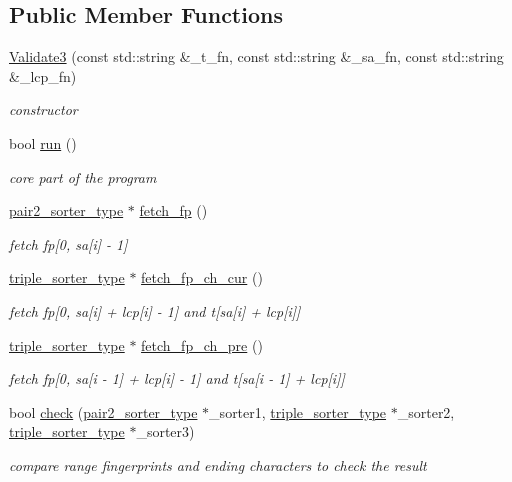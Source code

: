 \subsection*{Public Member Functions}
\begin{DoxyCompactItemize}
\item 
\hyperlink{class_validate3_ab0a59632c6e2b3bfdd0bf89483448d46}{Validate3} (const std\+::string \&\+\_\+t\+\_\+fn, const std\+::string \&\+\_\+sa\+\_\+fn, const std\+::string \&\+\_\+lcp\+\_\+fn)
\begin{DoxyCompactList}\small\item\em constructor \end{DoxyCompactList}\item 
bool \hyperlink{class_validate3_aaa21653a363d5adcc65b93ac34d22253}{run} ()
\begin{DoxyCompactList}\small\item\em core part of the program \end{DoxyCompactList}\item 
\hyperlink{class_validate3_a3a7778ec3337ed3baf9a7515cf0a94ad}{pair2\+\_\+sorter\+\_\+type} $\ast$ \hyperlink{class_validate3_ad41c23715467e5201ef2705d38d8f81d}{fetch\+\_\+fp} ()
\begin{DoxyCompactList}\small\item\em fetch fp\mbox{[}0, sa\mbox{[}i\mbox{]} -\/ 1\mbox{]} \end{DoxyCompactList}\item 
\hyperlink{class_validate3_ab3d4fd99ae8b2967f0b64b71a28efc66}{triple\+\_\+sorter\+\_\+type} $\ast$ \hyperlink{class_validate3_aeace570606a0320e2ad458145b7e16e3}{fetch\+\_\+fp\+\_\+ch\+\_\+cur} ()
\begin{DoxyCompactList}\small\item\em fetch fp\mbox{[}0, sa\mbox{[}i\mbox{]} + lcp\mbox{[}i\mbox{]} -\/ 1\mbox{]} and t\mbox{[}sa\mbox{[}i\mbox{]} + lcp\mbox{[}i\mbox{]}\mbox{]} \end{DoxyCompactList}\item 
\hyperlink{class_validate3_ab3d4fd99ae8b2967f0b64b71a28efc66}{triple\+\_\+sorter\+\_\+type} $\ast$ \hyperlink{class_validate3_abbf26d49c2f60ea8ecb3ba131f0a61ae}{fetch\+\_\+fp\+\_\+ch\+\_\+pre} ()
\begin{DoxyCompactList}\small\item\em fetch fp\mbox{[}0, sa\mbox{[}i -\/ 1\mbox{]} + lcp\mbox{[}i\mbox{]} -\/ 1\mbox{]} and t\mbox{[}sa\mbox{[}i -\/ 1\mbox{]} + lcp\mbox{[}i\mbox{]}\mbox{]} \end{DoxyCompactList}\item 
bool \hyperlink{class_validate3_ade475094c421af71da65620b706dec3f}{check} (\hyperlink{class_validate3_a3a7778ec3337ed3baf9a7515cf0a94ad}{pair2\+\_\+sorter\+\_\+type} $\ast$\+\_\+sorter1, \hyperlink{class_validate3_ab3d4fd99ae8b2967f0b64b71a28efc66}{triple\+\_\+sorter\+\_\+type} $\ast$\+\_\+sorter2, \hyperlink{class_validate3_ab3d4fd99ae8b2967f0b64b71a28efc66}{triple\+\_\+sorter\+\_\+type} $\ast$\+\_\+sorter3)
\begin{DoxyCompactList}\small\item\em compare range fingerprints and ending characters to check the result \end{DoxyCompactList}\end{DoxyCompactItemize}
